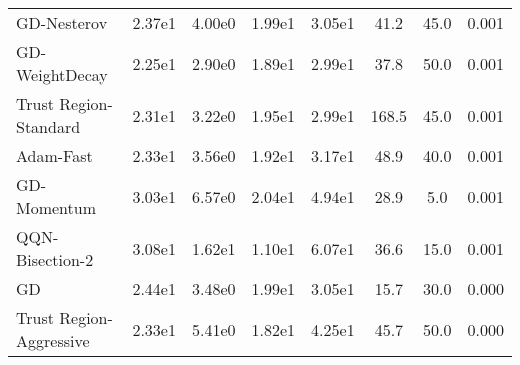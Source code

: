 \begin{table}[htbp]
{\begin{tabular}{p{2.5cm}*{7}{c}}
GD-Nesterov & 2.37e1 & 4.00e0 & 1.99e1 & 3.05e1 & 41.2 & 45.0 & 0.001 \\
GD-WeightDecay & 2.25e1 & 2.90e0 & 1.89e1 & 2.99e1 & 37.8 & 50.0 & 0.001 \\
Trust Region-Standard & 2.31e1 & 3.22e0 & 1.95e1 & 2.99e1 & 168.5 & 45.0 & 0.001 \\
Adam-Fast & 2.33e1 & 3.56e0 & 1.92e1 & 3.17e1 & 48.9 & 40.0 & 0.001 \\
GD-Momentum & 3.03e1 & 6.57e0 & 2.04e1 & 4.94e1 & 28.9 & 5.0 & 0.001 \\
QQN-Bisection-2 & 3.08e1 & 1.62e1 & 1.10e1 & 6.07e1 & 36.6 & 15.0 & 0.001 \\
GD & 2.44e1 & 3.48e0 & 1.99e1 & 3.05e1 & 15.7 & 30.0 & 0.000 \\
Trust Region-Aggressive & 2.33e1 & 5.41e0 & 1.82e1 & 4.25e1 & 45.7 & 50.0 & 0.000 \\
\bottomrule
\end{tabular}
}
\end{table}
